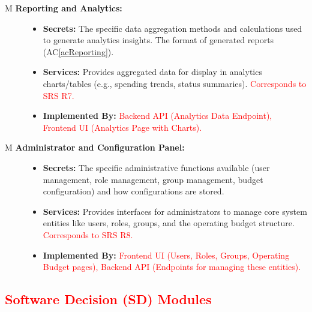 \documentclass[12pt, titlepage]{article}
\newcommand{\acref}[1]{AC\ref{#1}}
\newcounter{mnum}
\newcommand{\mthemnum}{M\themnum}
\begin{document}
\begin{description}
\item[ \mthemnum \label{mReporting} \textbf{Reporting and Analytics:}]
    \begin{itemize}
        \item \textbf{Secrets:} The specific data aggregation methods and calculations used to generate analytics insights. The format of generated reports (\acref{acReporting}).
        \item \textbf{Services:} Provides aggregated data for display in analytics charts/tables (e.g., spending trends, status summaries). \textcolor{red}{Corresponds to SRS R7.}
        \item \textbf{Implemented By:} \textcolor{red}{Backend API (Analytics Data Endpoint), Frontend UI (Analytics Page with Charts).}
    \end{itemize}

\item[ \mthemnum \label{mAdminPanel} \textbf{Administrator and Configuration Panel:}]
    \begin{itemize}
        \item \textbf{Secrets:} The specific administrative functions available (user management, role management, group management, budget configuration) and how configurations are stored.
        \item \textbf{Services:} Provides interfaces for administrators to manage core system entities like users, roles, groups, and the operating budget structure. \textcolor{red}{Corresponds to SRS R8.}
        \item \textbf{Implemented By:} \textcolor{red}{Frontend UI (Users, Roles, Groups, Operating Budget pages), Backend API (Endpoints for managing these entities).}
    \end{itemize}

\end{description}

\subsection{\textcolor{red}{Software Decision (SD) Modules}}
\end{document}
